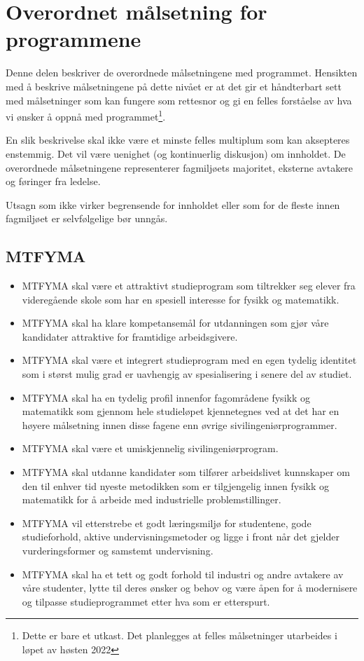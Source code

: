 \section{Overordnet målsetning for programmene}

Denne delen beskriver de overordnede målsetningene med programmet. Hensikten med å beskrive målsetningene på dette nivået er at det gir et håndterbart sett med målsetninger som kan fungere som rettesnor og gi en felles forståelse av hva vi ønsker å oppnå med programmet\footnote{Dette er bare et utkast. Det planlegges at felles målsetninger utarbeides i løpet av høsten 2022}.

En slik beskrivelse skal ikke være et minste felles multiplum som kan aksepteres enstemmig. Det vil være uenighet (og kontinuerlig diskusjon) om innholdet. De overordnede målsetningene representerer fagmiljøets majoritet, eksterne avtakere og føringer fra ledelse. 

Utsagn som ikke virker begrensende for innholdet eller som for de fleste innen fagmiljøet er selvfølgelige bør unngås.

\subsection{MTFYMA}

\begin{itemize}
	\item MTFYMA skal være et attraktivt studieprogram som tiltrekker seg elever fra videregående skole som har en spesiell interesse for fysikk og matematikk.
	\item MTFYMA skal ha klare kompetansemål for utdanningen som gjør våre kandidater attraktive for framtidige arbeidsgivere.
	\item MTFYMA skal være et integrert studieprogram med en egen tydelig identitet som i størst mulig grad er uavhengig av spesialisering i senere del av studiet.
	\item MTFYMA skal ha en tydelig profil innenfor fagområdene fysikk og matematikk som gjennom hele studieløpet kjennetegnes ved at det har en høyere målsetning innen disse fagene enn øvrige sivilingeniørprogrammer.
	\item MTFYMA skal være et umiskjennelig sivilingeniørprogram.
	\item MTFYMA skal utdanne kandidater som tilfører arbeidslivet kunnskaper om den til enhver tid nyeste metodikken som er tilgjengelig innen fysikk og matematikk for å arbeide med industrielle problemstillinger.
	\item MTFYMA vil etterstrebe et godt læringsmiljø for studentene, gode studieforhold, aktive undervisningsmetoder og ligge i front når det gjelder vurderingsformer og samstemt undervisning.
	\item MTFYMA skal ha et tett og godt forhold til industri og andre avtakere av våre studenter, lytte til deres ønsker og behov og være åpen for å modernisere og tilpasse studieprogrammet etter hva som er etterspurt.
\end{itemize}


